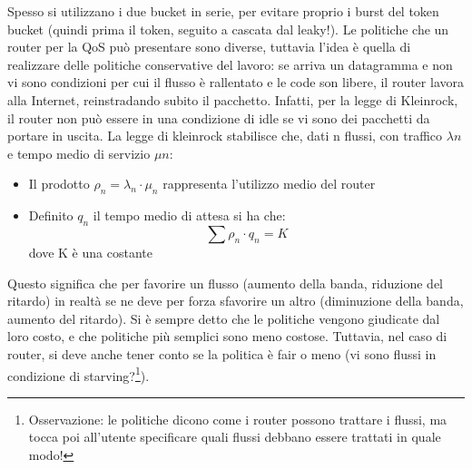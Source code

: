 Spesso si utilizzano i due bucket in serie, per evitare proprio i burst del
token bucket (quindi prima il token,
seguito a cascata dal leaky!).
Le politiche che un router per la QoS può presentare sono diverse, tuttavia
l'idea è quella di realizzare delle
politiche conservative del lavoro: se arriva un datagramma e non vi sono
condizioni per cui il flusso è rallentato
e le code son libere, il router lavora alla Internet, reinstradando subito il
pacchetto. Infatti, per la legge di
Kleinrock, il router non può essere in una condizione di idle se vi sono dei
pacchetti da portare in uscita. La legge
di kleinrock stabilisce che, dati n flussi, con traffico $\lambda n$ e tempo
medio di servizio $\mu n$:
\begin{itemize}
 \item Il prodotto $\rho_n = \lambda_n \cdot \mu_n$ rappresenta l'utilizzo medio
del router
 \item Definito $q_n$ il tempo medio di attesa si ha che:
 \begin{equation}
  \sum \rho_n \cdot q_n = K
 \end{equation}
 dove K è una costante
\end{itemize}
Questo significa che per favorire un flusso (aumento della banda, riduzione del
ritardo) in realtà se ne deve per
forza sfavorire un altro (diminuzione della banda, aumento del ritardo).
Si è sempre detto che le politiche vengono giudicate dal loro costo, e che
politiche più semplici sono meno costose.
Tuttavia, nel caso di router, si deve anche tener conto se la politica è fair o
meno (vi sono flussi in condizione di
starving?\footnote{Osservazione: le politiche dicono come i router possono
trattare i flussi, ma tocca poi all’utente
specificare quali flussi debbano essere trattati in quale modo!}).

